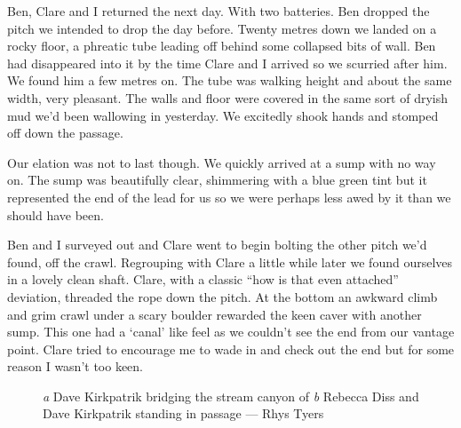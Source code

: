 \begin{marginfigure}
\end{marginfigure}
Ben, Clare and I returned the next day. With two batteries. Ben dropped the pitch we intended to drop the day before. Twenty metres down we landed on a rocky floor, a phreatic tube leading off behind some collapsed bits of wall. Ben had disappeared into it by the time Clare and I arrived so we scurried after him. We found him a few metres on. The tube was walking height and about the same width, very pleasant. The walls and floor were covered in the same sort of dryish mud we’d been wallowing in yesterday. We excitedly shook hands and stomped off down the passage.
 
Our elation was not to last though. We quickly arrived at a sump with no way on. The sump was beautifully clear, shimmering with a blue green tint but it represented the end of the lead for us so we were perhaps less awed by it than we should have been.
 
Ben and I surveyed out and Clare went to begin bolting the other pitch we’d found, off the crawl. Regrouping with Clare a little while later we found ourselves in a lovely clean shaft. Clare, with a classic “how is that even attached” deviation, threaded the rope down the pitch. At the bottom an awkward climb and grim crawl under a scary boulder rewarded the keen caver with another sump. This one had a ‘canal’ like feel as we couldn’t see the end from our vantage point. Clare tried to encourage me to wade in and check out the end but for some reason I wasn’t too keen.
 
  \begin{figure}[t!]
\checkoddpage \ifoddpage \forcerectofloat \else \forceversofloat \fi
\centering
\begin{subfigure}[t]{0.495\textwidth}
\centering
{}
 \caption{}\label{water hallelujah}
\end{subfigure}
    \hfill
    \begin{subfigure}[t]{0.495\textwidth}
        \centering
        \caption{} \label{Diss and Dave}
    \end{subfigure}
    \caption{
    \emph{a} Dave Kirkpatrik bridging the stream canyon of 
    \emph{b} Rebecca Diss and Dave Kirkpatrik standing in  passage --- Rhys Tyers}
\end{figure}
 
